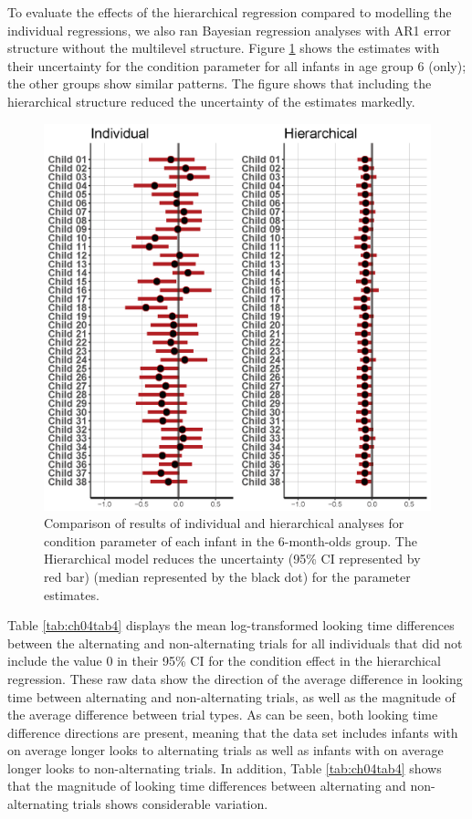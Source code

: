 \documentclass[openright,titlepage,12pt,a4paper]{book}
\begin{document}
To evaluate the effects of the hierarchical regression compared to modelling the individual regressions, we also ran Bayesian regression analyses with AR1 error structure without the multilevel structure. Figure \ref{fig:ch04fig8} shows the estimates with their uncertainty for the condition parameter for all infants in age group 6 (only); the other groups show similar patterns. The figure shows that including the hierarchical structure reduced the uncertainty of the estimates markedly.

\begin{figure}

{\centering \includegraphics[width=0.9\linewidth]{figures/chapter_4/Figure8} 

}

\caption{Comparison of results of individual and hierarchical analyses for condition parameter of each infant in the 6-month-olds group. The Hierarchical model reduces the uncertainty (95\% CI represented by red bar) (median represented by the black dot) for the parameter estimates.}\label{fig:ch04fig8}
\end{figure}

Table \ref{tab:ch04tab4} displays the mean log-transformed looking time differences between the alternating and non-alternating trials for all individuals that did not include the value 0 in their 95\% CI for the condition effect in the hierarchical regression. These raw data show the direction of the average difference in looking time between alternating and non-alternating trials, as well as the magnitude of the average difference between trial types. As can be seen, both looking time difference directions are present, meaning that the data set includes infants with on average longer looks to alternating trials as well as infants with on average longer looks to non-alternating trials. In addition, Table \ref{tab:ch04tab4} shows that the magnitude of looking time differences between alternating and non-alternating trials shows considerable variation.
\end{document}

